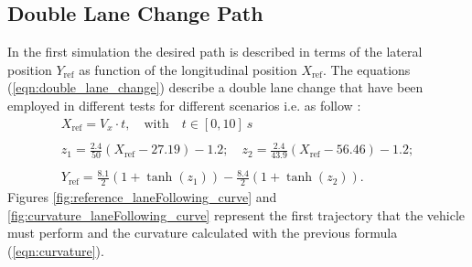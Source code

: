\subsection{Double Lane Change Path}
In the first simulation the desired path is described in terms of the lateral position $Y_\text{ref}$ as function of the
longitudinal position $X_\text{ref}$. The equations (\ref{eqn:double_lane_change}) describe a double lane change that have
been employed in different tests for different scenarios i.e. \cite{Falcone2007a} \cite{Falcone2007b} \cite{Falcone2006} as follow :
\begin{equation}
\label{eqn:double_lane_change}
\begin{array}{cccc}
X_\text{ref}=V_x\cdot t, \quad\text{with}\quad t\in[0,10]\SI{}{s} \\\\
z_1 = \displaystyle
\frac{2.4}{50}(X_\text{ref}-27.19)-1.2;\quad
z_2=\displaystyle\frac{2.4}{43.9}(X_\text{ref}-56.46)-1.2;\\\\
Y_\text{ref}=\displaystyle\frac{8.1}{2}(1+\tanh(z_1)) - \frac{8.4}{2}(1+\tanh(z_2)).
\end{array}
\end{equation}
Figures \ref{fig:reference_laneFollowing_curve} and \ref{fig:curvature_laneFollowing_curve} represent the first trajectory that the vehicle must perform and the curvature calculated with the previous formula (\ref{eqn:curvature}). 

